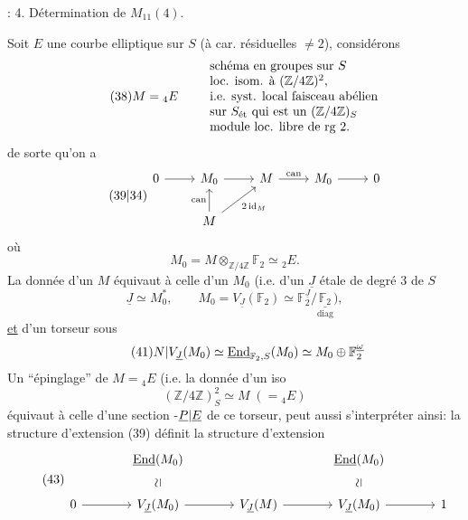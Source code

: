 :
4. Détermination de $M_{11}(4)$.

Soit $E$ une courbe elliptique sur $S$ (à car. résiduelles $\ne2$), considérons
\[
\tag{38}M={}_4E\qquad\begin{array}{l}
\text{schéma en groupes sur }S\\
\text{loc. isom. à }(\mathbb Z/4\mathbb Z)^2,\\
\text{i.e. }\text{syst. local}\text{ faisceau abélien}\\
\text{sur }S_{\text{ét}}\text{ qui est un }(\mathbb Z/4\mathbb Z)_S\\
\text{module loc. libre de rg }2.
\end{array}
\]
de sorte qu'on a
\[
\tag{\unsure{39|34}}\diagram{\begin{tikzcd}[ampersand replacement=\&]
0\arrow[r]\&M_0\arrow[r]\&M\arrow[r,"\mathrm{can}"]\&M_0\arrow[r]\&0\\
\&M\arrow[u,"\mathrm{can}"]\arrow[ur,"2\operatorname{id}_M"']\&\&\&
\end{tikzcd}}
\]
où
\[
M_0=M\otimes_{\mathbb Z/4\mathbb Z}\mathbb F_2\simeq{}_2E.
\]
La donnée d'un $M$ équivaut à celle d'un $M_0$ (i.e. d'un $\underline J$  étale de degré $3$ de $S$ 
\[
\tag{40}\underline J\simeq M_0^*,\qquad M_0=V_{\underline J}(\mathbb F_2)\simeq\mathbb F_2^{\underline J}/\underset{\mathrm{diag}}{\underline{\mathbb F_2}}),
\]
\uline{et} d'un torseur  sous
\[
\tag{41}N|V_{\underline J}(M_0)\simeq\underline{\operatorname{End}}_{\mathbb F_2,S}(M_0)\simeq M_0\oplus\mathbb F_2^{\underline\omega}
\]
Un ``épinglage'' de $M={}_4E$ (i.e.  la donnée d'un iso
\[
\tag{42}(\mathbb Z/4\mathbb Z)^2_S\simeq M\;(={}_4E)
\]
équivaut à celle d'une  section -$\underline P|\underline E$
de ce torseur,   peut aussi s'interpréter ainsi: la structure d'extension (39)  définit la structure d'extension
\[
\tag{43}\diagram{\begin{tikzcd}[ampersand replacement=\&,column sep=large]
\&\underline{\operatorname{End}}(M_0)\arrow[d,phantom,"\rotatebox{90}{$\simeq$}"]\&\&\underline{\operatorname{End}}(M_0)\arrow[d,phantom,"\rotatebox{90}{$\simeq$}"]\&\\
0\arrow[r]\&V_{\underline J}(M_0)\arrow[r]\&V_{\underline J}(M)\arrow[r]\&V_{\underline J}(M_0)\arrow[r]\&1
\end{tikzcd}}
\]
